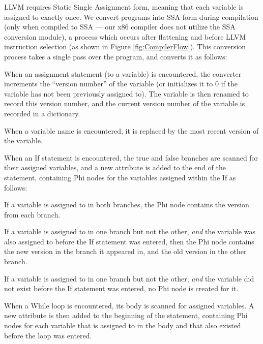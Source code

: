 \documentclass[11pt,twocolumn]{article}
\newenvironment{packed_enum}{
\begin{enumerate}
  \setlength{\itemsep}{1pt}
  \setlength{\parskip}{0pt}
  \setlength{\parsep}{0pt}
}{\end{enumerate}}
\begin{document}
LLVM requires Static Single Assignment form, meaning that each
variable is assigned to exactly once.  We convert programs into SSA
form during compilation (only when compiled to SSA --- our x86
compiler does not utilize the SSA conversion module), a process which
occurs after flattening and before LLVM instruction
selection (as shown in Figure \ref{fig:CompilerFlow}).  This
conversion process takes a single pass over the program, and converts
it as follows:

\begin{packed_enum}
\item When an assignment statement (to a variable) is encountered, the
  converter increments the ``version number'' of the variable (or
  initializes it to $0$ if the variable has not been previously
  assigned to). The variable is then renamed to record this version
  number, and the current version number of the variable is recorded
  in a dictionary.
\item When a variable name is encountered, it is replaced by the most
  recent version of the variable.
\item When an If statement is encountered, the true and false branches
  are scanned for their assigned variables, and a new attribute is
  added to the end of the statement, containing Phi nodes for the
  variables assigned within the If as follows:
  \begin{packed_enum}
  \item If a variable is assigned to in both branches, the Phi node
    contains the version from each branch.
  \item If a variable is assigned to in one branch but not the other,
    \textit{and} the variable was also assigned to before the If
    statement was entered, then the Phi node contains the new version
    in the branch it appeared in, and the old version in the other
    branch.
  \item If a variable is assigned to in one branch but not the other,
    \textit{and} the variable did not exist before the If
    statement was entered, no Phi node is created for it.
  \end{packed_enum}
\item When a While loop is encountered, its body is scanned for
  assigned variables. A new attribute is then added to the beginning
  of the statement, containing Phi nodes for each variable that is
  assigned to in the body and that also existed before the loop was
  entered.
\end{packed_enum}
\end{document}
